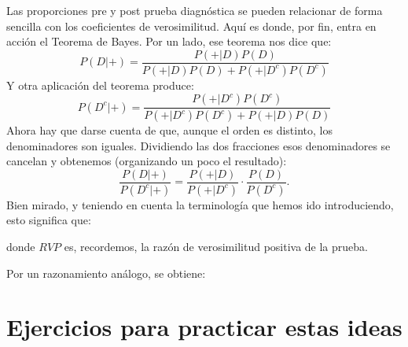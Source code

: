\documentclass[10pt,a4paper]{article}
\begin{document}
Las proporciones pre y post prueba diagnóstica se pueden relacionar de forma sencilla con los coeficientes de verosimilitud. Aquí es donde, por fin, entra en acción el Teorema de Bayes. Por un lado, ese teorema nos dice que:
\[
P(D|+)=\dfrac{P(+|D)P(D)}{P(+|D)P(D)+P(+|D^c)P(D^c)}
\]
Y otra aplicación del teorema produce:
\[
P(D^c|+)=\dfrac{P(+|D^c)P(D^c)}{P(+|D^c)P(D^c)+P(+|D)P(D)}
\]
Ahora hay que darse cuenta de que, aunque el orden es distinto, los denominadores son iguales. Dividiendo las dos fracciones esos denominadores se cancelan y obtenemos (organizando un poco el resultado):
\[
\dfrac{P(D|+)}{P(D^c|+)}=\dfrac{P(+|D)}{P(+|D^c)}\cdot\dfrac{P(D)}{P(D^c)}.
\]
Bien mirado, y teniendo en cuenta la terminología que hemos ido introduciendo, esto significa que:
\begin{center}
\end{center}
donde $RVP$ es, recordemos, la razón de verosimilitud positiva de la prueba.

Por un razonamiento análogo, se obtiene:
\begin{center}
\end{center}


\section{Ejercicios para practicar estas ideas}
\end{document}
